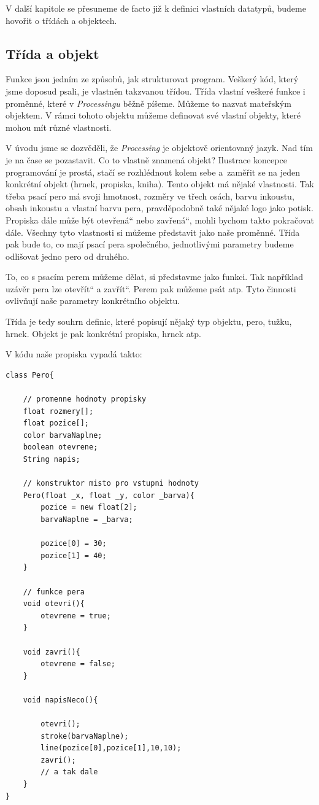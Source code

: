 \documentclass[10pt,twoside=true,open=right,cleardoublepage=empty,chapterprefix=true]{scrbook}
\renewcommand\uv[1]{\quotedblbase #1\textquotedblleft}%
\newcommand{\pododdil}[1]{\subsection{#1}\index{#1}\label{#1}}
\newcommand{\lnb}{\linebreak}
\begin{document}
V další kapitole se přesuneme de facto již k definici vlastních datatypů, budeme hovořit o třídách a objektech.





\pododdil{Třída a objekt}

Funkce jsou jedním ze způsobů, jak strukturovat program. Veškerý kód, který jsme doposud psali, je vlastněn takzvanou třídou. Třída vlastní veškeré funkce i proměnné, které v {\em Processingu} běžně píšeme. Můžeme to nazvat mateřským objektem. V rámci tohoto objektu můžeme definovat své vlastní objekty, které mohou mít různé vlastnosti.

V úvodu jsme se dozvěděli, že {\em Processing} je objektově orientovaný jazyk. Nad tím je na čase se pozastavit. Co to vlastně znamená objekt? Ilus\-trace koncepce programování je prostá, stačí se rozhlédnout kolem sebe a~zaměřit se na jeden konkrétní objekt (hrnek, propiska, kniha). Tento \lnb objekt má nějaké vlastnosti. Tak třeba psací pero má svoji hmotnost, rozměry ve třech osách, barvu inkoustu, obsah inkoustu a vlastní barvu pera, pravděpodobně také nějaké logo jako potisk. Propiska dále může být \lnb \uv{otevřená} nebo \uv{zavřená}, mohli bychom takto pokračovat dále. Všechny tyto vlastnosti si můžeme představit jako naše proměnné. Třída pak bude to, co mají psací pera společného, jednotlivými parametry budeme odlišovat jedno pero od druhého.

To, co s psacím perem můžeme dělat, si představme jako funkci. Tak například uzávěr pera lze \uv{otevřít} a \uv{zavřít}. Perem pak můžeme psát atp. Tyto činnosti ovlivňují naše parametry konkrétního objektu.

Třída je tedy souhrn definic, které popisují nějaký typ objektu, pero, tužku, hrnek. Objekt je pak konkrétní propiska, hrnek atp.

V kódu naše propiska vypadá takto:


\begin{lstlisting}
class Pero{

	// promenne hodnoty propisky
	float rozmery[];
	float pozice[];
	color barvaNaplne;
	boolean otevrene;
	String napis;

	// konstruktor misto pro vstupni hodnoty
	Pero(float _x, float _y, color _barva){
		pozice = new float[2];
		barvaNaplne = _barva;
		
		pozice[0] = 30;
		pozice[1] = 40;
	}
	
	// funkce pera
	void otevri(){
		otevrene = true;
	}
	
	void zavri(){
		otevrene = false;
	}
	
	void napisNeco(){
	
		otevri();
		stroke(barvaNaplne);
		line(pozice[0],pozice[1],10,10);
		zavri();
		// a tak dale
	}
}

\end{lstlisting}
\end{document}
